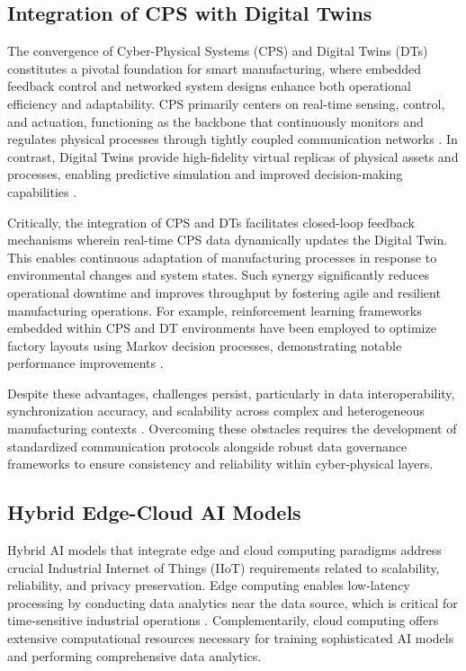 \documentclass[sigconf]{acmart}
\begin{document}
\subsection{Integration of CPS with Digital Twins}

The convergence of Cyber-Physical Systems (CPS) and Digital Twins (DTs) constitutes a pivotal foundation for smart manufacturing, where embedded feedback control and networked system designs enhance both operational efficiency and adaptability. CPS primarily centers on real-time sensing, control, and actuation, functioning as the backbone that continuously monitors and regulates physical processes through tightly coupled communication networks \cite{ref9}. In contrast, Digital Twins provide high-fidelity virtual replicas of physical assets and processes, enabling predictive simulation and improved decision-making capabilities \cite{ref12}.

Critically, the integration of CPS and DTs facilitates closed-loop feedback mechanisms wherein real-time CPS data dynamically updates the Digital Twin. This enables continuous adaptation of manufacturing processes in response to environmental changes and system states. Such synergy significantly reduces operational downtime and improves throughput by fostering agile and resilient manufacturing operations. For example, reinforcement learning frameworks embedded within CPS and DT environments have been employed to optimize factory layouts using Markov decision processes, demonstrating notable performance improvements \cite{ref10}.

Despite these advantages, challenges persist, particularly in data interoperability, synchronization accuracy, and scalability across complex and heterogeneous manufacturing contexts \cite{ref13}. Overcoming these obstacles requires the development of standardized communication protocols alongside robust data governance frameworks to ensure consistency and reliability within cyber-physical layers.

\subsection{Hybrid Edge-Cloud AI Models}

Hybrid AI models that integrate edge and cloud computing paradigms address crucial Industrial Internet of Things (IIoT) requirements related to scalability, reliability, and privacy preservation. Edge computing enables low-latency processing by conducting data analytics near the data source, which is critical for time-sensitive industrial operations \cite{ref15}. Complementarily, cloud computing offers extensive computational resources necessary for training sophisticated AI models and performing comprehensive data analytics.
\end{document}

